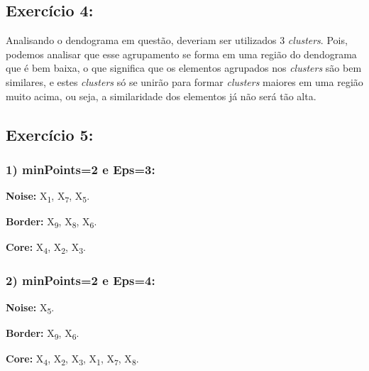 \documentclass[
    article,            %
    11pt,               %
    oneside,            %
    a4paper,            %
    english,            %
    brazil,             %
    sumario=tradicional,
    ]{abntex2}
\begin{document}
\subsection*{\textbf{Exercício 4:}}

Analisando o dendograma em questão, deveriam ser utilizados 3 \textit{clusters}. Pois, podemos analisar que esse agrupamento se forma em uma região do dendograma que é bem baixa, o que significa que os elementos agrupados nos \textit{clusters} são bem similares, e estes \textit{clusters} só se unirão para formar \textit{clusters} maiores em uma região muito acima, ou seja, a similaridade dos elementos já não será tão alta. 

\subsection*{\textbf{Exercício 5:}}

\subsubsection*{\textbf{1) minPoints=2 e Eps=3:}}

\textbf{Noise:}  X\textsubscript{1}, X\textsubscript{7}, X\textsubscript{5}.

\textbf{Border:} X\textsubscript{9}, X\textsubscript{8}, X\textsubscript{6}.

\textbf{Core:} X\textsubscript{4}, X\textsubscript{2}, X\textsubscript{3}.

\subsubsection*{\textbf{2) minPoints=2 e Eps=4:}}

\textbf{Noise:} X\textsubscript{5}.
    
\textbf{Border:} X\textsubscript{9}, X\textsubscript{6}.

\textbf{Core:} X\textsubscript{4}, X\textsubscript{2}, X\textsubscript{3}, X\textsubscript{1}, X\textsubscript{7}, X\textsubscript{8}.
% 


\postextual

\nocite{slides}

\end{document}
